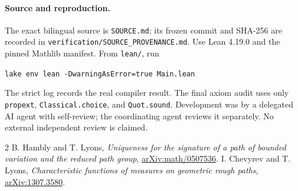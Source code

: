 \documentclass[11pt]{article}
\begin{document}
\paragraph{Source and reproduction.}
The exact bilingual source is \texttt{SOURCE.md}; its frozen commit
and SHA-256 are recorded in
\texttt{verification/SOURCE\_PROVENANCE.md}.
Use Lean 4.19.0 and the pinned Mathlib manifest. From \texttt{lean/}, run
\begin{center}\texttt{lake env lean -DwarningAsError=true Main.lean}\end{center}
The strict log records the real compiler result. The final axiom audit
uses only \texttt{propext}, \texttt{Classical.choice}, and
\texttt{Quot.sound}. Development was by a delegated AI agent with
self-review; the coordinating agent reviews it separately. No external
independent review is claimed.

\begin{thebibliography}{2}
 B. Hambly and T. Lyons,
\emph{Uniqueness for the signature of a path of bounded variation
and the reduced path group},
\href{https://arxiv.org/abs/math/0507536}{arXiv:math/0507536}.
 I. Chevyrev and T. Lyons,
\emph{Characteristic functions of measures on geometric rough paths},
\href{https://arxiv.org/abs/1307.3580}{arXiv:1307.3580}.
\end{thebibliography}
\end{document}
